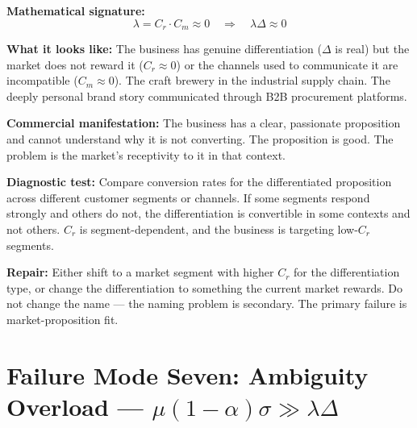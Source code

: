 \documentclass[12pt, openany]{book}
\theoremstyle{thmstyle}
\theoremstyle{defstyle}
\begin{document}
\begin{failbox}
\textbf{Mathematical signature:}
\[
\lambda = C_r \cdot C_m \approx 0 \quad \Rightarrow \quad \lambda\Delta \approx 0
\]

\textbf{What it looks like:} The business has genuine differentiation ($\Delta$ is real) but the market does not reward it ($C_r \approx 0$) or the channels used to communicate it are incompatible ($C_m \approx 0$). The craft brewery in the industrial supply chain. The deeply personal brand story communicated through B2B procurement platforms.

\textbf{Commercial manifestation:} The business has a clear, passionate proposition and cannot understand why it is not converting. The proposition is good. The problem is the market's receptivity to it in that context.

\textbf{Diagnostic test:} Compare conversion rates for the differentiated proposition across different customer segments or channels. If some segments respond strongly and others do not, the differentiation is convertible in some contexts and not others. $C_r$ is segment-dependent, and the business is targeting low-$C_r$ segments.

\textbf{Repair:} Either shift to a market segment with higher $C_r$ for the differentiation type, or change the differentiation to something the current market rewards. Do not change the name --- the naming problem is secondary. The primary failure is market-proposition fit.
\end{failbox}

\section{Failure Mode Seven: Ambiguity Overload --- $\mu(1-\alpha)\sigma \gg \lambda\Delta$}
\end{document}

